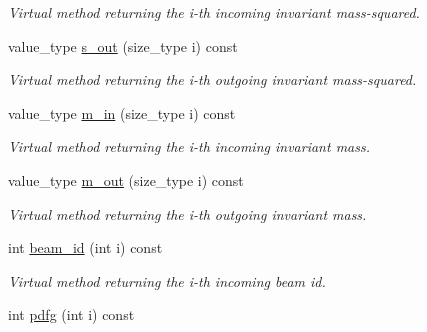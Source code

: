 \begin{DoxyCompactItemize}
\begin{DoxyCompactList}\small\item\em Virtual method returning the i-\/th incoming invariant mass-\/squared. \end{DoxyCompactList}\item 
\hypertarget{a00454_aa699b69bec92a21f6839b0524a931bad}{}value\+\_\+type \hyperlink{a00454_aa699b69bec92a21f6839b0524a931bad}{s\+\_\+out} (size\+\_\+type i) const \label{a00454_aa699b69bec92a21f6839b0524a931bad}

\begin{DoxyCompactList}\small\item\em Virtual method returning the i-\/th outgoing invariant mass-\/squared. \end{DoxyCompactList}\item 
\hypertarget{a00454_ad1a3712c7a9f03af5b03bcd9c2456246}{}value\+\_\+type \hyperlink{a00454_ad1a3712c7a9f03af5b03bcd9c2456246}{m\+\_\+in} (size\+\_\+type i) const \label{a00454_ad1a3712c7a9f03af5b03bcd9c2456246}

\begin{DoxyCompactList}\small\item\em Virtual method returning the i-\/th incoming invariant mass. \end{DoxyCompactList}\item 
\hypertarget{a00454_ae0116ee1367ce23c1d298b2d46f2145f}{}value\+\_\+type \hyperlink{a00454_ae0116ee1367ce23c1d298b2d46f2145f}{m\+\_\+out} (size\+\_\+type i) const \label{a00454_ae0116ee1367ce23c1d298b2d46f2145f}

\begin{DoxyCompactList}\small\item\em Virtual method returning the i-\/th outgoing invariant mass. \end{DoxyCompactList}\item 
\hypertarget{a00454_a6f480161dcbc65da52d00028021d0bc4}{}int \hyperlink{a00454_a6f480161dcbc65da52d00028021d0bc4}{beam\+\_\+id} (int i) const \label{a00454_a6f480161dcbc65da52d00028021d0bc4}

\begin{DoxyCompactList}\small\item\em Virtual method returning the i-\/th incoming beam id. \end{DoxyCompactList}\item 
\hypertarget{a00454_a3b911ea154229ac67148cd5d54ac5b64}{}int \hyperlink{a00454_a3b911ea154229ac67148cd5d54ac5b64}{pdfg} (int i) const \label{a00454_a3b911ea154229ac67148cd5d54ac5b64}


\end{DoxyCompactItemize}
